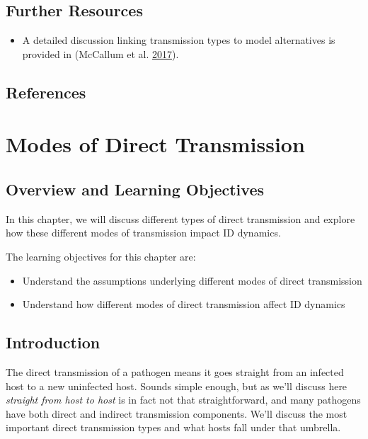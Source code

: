 \documentclass[]{book}
\providecommand{\tightlist}{%
  \setlength{\itemsep}{0pt}\setlength{\parskip}{0pt}}
\theoremstyle{definition}
\theoremstyle{definition}
\theoremstyle{definition}
\theoremstyle{remark}
\begin{document}
\section{Further Resources}\label{further-resources-4}

\begin{itemize}
\tightlist
\item
  A detailed discussion linking transmission types to model alternatives
  is provided in (McCallum et al.
  \protect\hyperlink{ref-mccallum17}{2017}).
\end{itemize}

\section{References}\label{references-5}

\chapter{Modes of Direct
Transmission}\label{modes-of-direct-transmission}

\section{Overview and Learning
Objectives}\label{overview-and-learning-objectives-5}

In this chapter, we will discuss different types of direct transmission
and explore how these different modes of transmission impact ID
dynamics.

The learning objectives for this chapter are:

\begin{itemize}
\tightlist
\item
  Understand the assumptions underlying different modes of direct
  transmission
\item
  Understand how different modes of direct transmission affect ID
  dynamics
\end{itemize}

\section{Introduction}\label{introduction-5}

The direct transmission of a pathogen means it goes straight from an
infected host to a new uninfected host. Sounds simple enough, but as
we'll discuss here \emph{straight from host to host} is in fact not that
straightforward, and many pathogens have both direct and indirect
transmission components. We'll discuss the most important direct
transmission types and what hosts fall under that umbrella.
\end{document}
